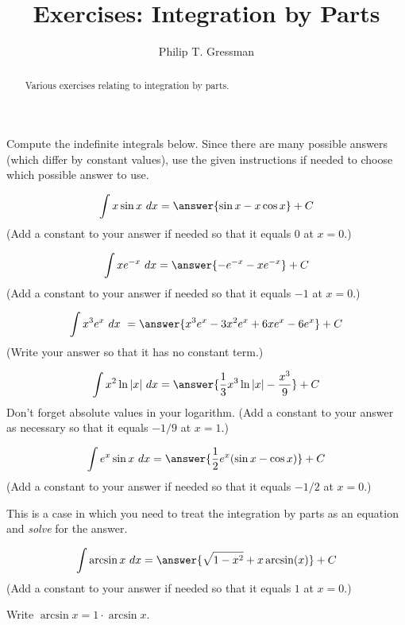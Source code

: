 \documentclass{ximera}
\title{Exercises: Integration by Parts}
\author{Philip T. Gressman}
\begin{document}
\begin{abstract}
Various exercises relating to integration by parts.
\end{abstract}
\maketitle


Compute the indefinite integrals below. Since there are many possible answers (which differ by constant values), use the given instructions if needed to choose which possible answer to use.

\begin{exercise}%
\[  \int x\sin x\ dx = \answer{\sin x - x\cos x} +C\]
(Add a constant to your answer if needed so that it equals $0$ at $x = 0$.)
%
%
\end{exercise}

\begin{exercise}%
\[ \int xe^{-x}\ dx = \answer{-e^{-x}-xe^{-x}}+C\]
(Add a constant to your answer if needed so that it equals $-1$ at $x = 0$.)
%
%
\end{exercise}

\begin{exercise}%
\[  \int x^3e^{x}\ dx\ = \answer{x^3e^x-3x^2e^x+6xe^x-6e^x}+C\]
(Write your answer so that it has no constant term.)
%
%
\end{exercise}

\begin{exercise}%
\[ \int x^2\ln |x| \ dx = \answer{\frac{1}{3} x^3 \ln |x|-\frac{x^3}{9}}+C\]
Don't forget absolute values in your logarithm.
(Add a constant to your answer as necessary so that it equals $-1/9$ at $x = 1$.)
%
%
\end{exercise}

\begin{exercise}%
\[ \int e^x\sin x\ dx = \answer{\frac{1}{2} e^x(\sin x-\cos x)}+C\]
(Add a constant to your answer if needed so that it equals $-1/2$ at $x = 0$.)
\begin{hint}
This is a case in which you need to treat the integration by parts as an equation and \textit{solve} for the answer.
\end{hint}
%
%
\end{exercise}

\begin{exercise}%
\[ \int \arcsin x\ dx = \answer{\sqrt{1-x^2}+x \arcsin(x)}+C \]
(Add a constant to your answer if needed so that it equals $1$ at $x = 0$.)
\begin{hint}
Write $\arcsin x = 1 \cdot \arcsin x$.
\end{hint}
%
%
\end{exercise}
\end{document}
